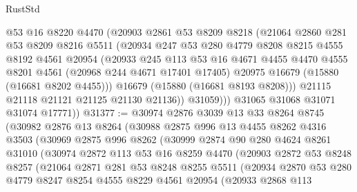\begin{lexlean}{RustStd}
\begin{coremodule}
              @53
              @16
              @8220
              @4470
              (@20903
                @2861
                @53
                @8209
                @8218
                (@21064
                  @2860
                  @281
                  @53
                  @8209
                  @8216
                  @5511
                  (@20934
                    @247
                    @53
                    @280
                    @4779
                    @8208
                    @8215
                    @4555
                    @8192
                    @4561
                    @20954
                    (@20933
                      @245
                      @113
                      @53
                      @16
                      @4671
                      @4455
                      @4470
                      @4555
                      @8201
                      @4561
                      (@20968 @244 @4671 @17401 @17405)
                      @20975
                      @16679
                      (@15880 (@16681 @8202 @4455)))
                    @16679
                    (@15880 (@16681 @8193 @8208)))
                  @21115
                  @21118
                  @21121
                  @21125
                  @21130
                  @21136))
              @31059)))
        @31065
        @31068
        @31071
        @31074
        @17771))
@31377 := @30974
    @2876
    @3039
    @13
    @33
    @8264
    @8745
    (@30982
      @2876
      @13
      @8264
      (@30988
        @2875
        @996
        @13
        @4455
        @8262
        @4316
        @3503
        (@30969
          @2875
          @996
          @8262
          (@30999
            @2874
            @90
            @280
            @4624
            @8261
            @31010
            (@30974
              @2872
              @113
              @53
              @16
              @8259
              @4470
              (@20903
                @2872
                @53
                @8248
                @8257
                (@21064
                  @2871
                  @281
                  @53
                  @8248
                  @8255
                  @5511
                  (@20934
                    @2870
                    @53
                    @280
                    @4779
                    @8247
                    @8254
                    @4555
                    @8229
                    @4561
                    @20954
                    (@20933
                      @2868
                      @113

\end{coremodule}
\end{lexlean}
